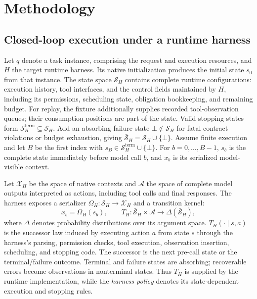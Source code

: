 \documentclass{article}
\begin{document}
\section{Methodology}
\label{sec:method}
\subsection{Closed-loop execution under a runtime harness}
\label{sec:closed-loop}

Let $q$ denote a task instance, comprising the request and execution resources,
and $H$ the target runtime harness. Its native initialization produces the
initial state $s_0$ from that instance. The state space $\mathcal S_H$ contains
complete runtime configurations: execution history, tool interfaces, and
the control fields maintained by $H$, including its permissions, scheduling
state, obligation bookkeeping, and remaining budget.
For replay, the fixture additionally supplies recorded tool-observation queues;
their consumption positions are part of the state.
Valid stopping states form $\mathcal S_H^{\mathrm{term}}\subseteq\mathcal S_H$.
Add an absorbing failure state $\bot\notin\mathcal S_H$ for fatal contract
violations or budget exhaustion, giving
$\bar{\mathcal S}_H=\mathcal S_H\cup\{\bot\}$. Assume finite execution and let
$B$ be the first index with $s_B\in\mathcal S_H^{\mathrm{term}}\cup\{\bot\}$.
For $b=0,\ldots,B-1$, $s_b$ is the complete state immediately before model call
$b$, and $x_b$ is its serialized model-visible context.

Let $\mathcal X_H$ be the space of native contexts and $\mathcal A$ the space
of complete model outputs interpreted as actions, including tool calls and
final responses. The harness exposes a serializer
$\Omega_H:\mathcal S_H\to\mathcal X_H$ and a transition kernel:
\begin{equation}
x_b=\Omega_H(s_b),
\qquad
T_H:\bar{\mathcal S}_H\times\mathcal A
\rightarrow\Delta(\bar{\mathcal S}_H),
\label{eq:harness-operators}
\end{equation}
where $\Delta$ denotes probability distributions over its argument space.
$T_H(\cdot\mid s,a)$ is the successor law induced by executing action $a$ from
state $s$ through the harness's parsing, permission checks, tool execution,
observation insertion, scheduling, and stopping code. The successor is the
next pre-call state or the terminal/failure outcome. Terminal and failure
states are absorbing; recoverable errors become observations in nonterminal
states. Thus $T_H$ is supplied by the runtime implementation, while the
\emph{harness policy} denotes its state-dependent execution and stopping rules.
\end{document}
